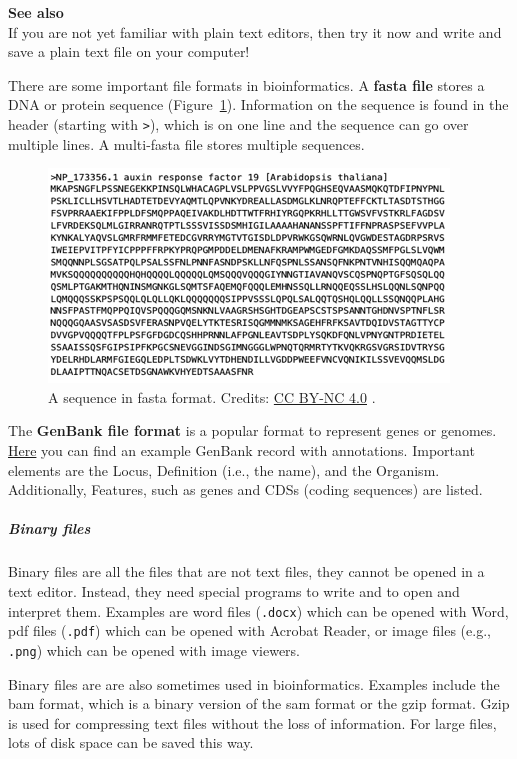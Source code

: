 \begin{framed}
\textbf{See also}\\
If you are not yet familiar with plain text editors, then try it now and write and save a plain text file on your computer!
\end{framed}

There are some important file formats in bioinformatics.
A \textbf{fasta file} stores a DNA or protein sequence (Figure~\ref{fasta}).
Information on the sequence is found in the header (starting with \texttt{\textgreater }), which is on one line and the sequence can go over multiple lines.
A multi-fasta file stores multiple sequences.

\begin{figure}[!htbp]
\centering
\includegraphics[width=0.5\linewidth]{files/fasta-838a5085fa938c75bc15fa75c6541b53.png}
\caption[]{A sequence in fasta format.
Credits: \href{https://creativecommons.org/licenses/by-nc/4.0/}{CC BY-NC 4.0} \cite{own_1_2024}.}
\label{fasta}
\end{figure}

The \textbf{GenBank file format} is a popular format to represent genes or genomes.
\href{https://www.ncbi.nlm.nih.gov/Sitemap/samplerecord.html}{Here} you can find an example GenBank record with annotations.
Important elements are the Locus, Definition (i.e., the name), and the Organism.
Additionally, Features, such as genes and CDSs (coding sequences) are listed.

\subparagraph{Binary files}

Binary files are all the files that are not text files, they cannot be opened in a text editor.
Instead, they need special programs to write and to open and interpret them.
Examples are word files (\texttt{.docx}) which can be opened with Word, pdf files (\texttt{.pdf}) which can be opened with Acrobat Reader, or image files (e.g., \texttt{.png}) which can be opened with image viewers.

Binary files are are also sometimes used in bioinformatics.
Examples include the bam format, which is a binary version of the sam format or the gzip format.
Gzip is used for compressing text files without the loss of information.
For large files, lots of disk space can be saved this way.


